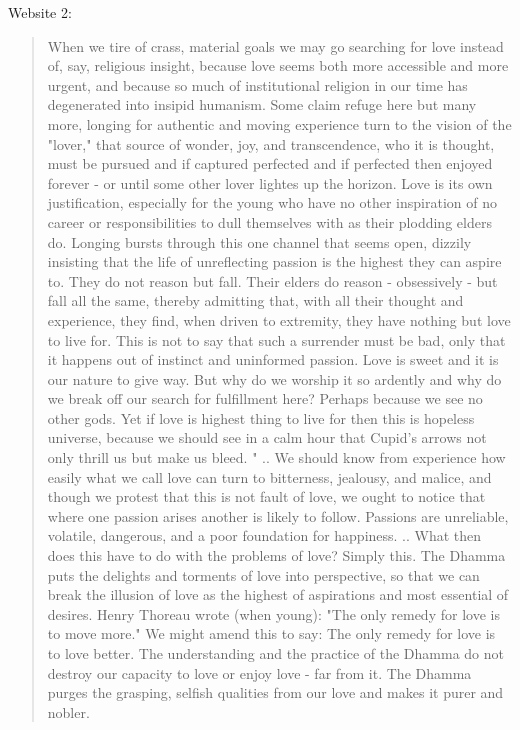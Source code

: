 \documentclass{book}
\begin{document}
Website 2:
\begin{quotation}
When we tire of crass, material goals we may go searching for love instead of, say, religious insight, because love seems both more accessible and more urgent, and because so much of institutional religion in our time has degenerated into insipid humanism. Some claim refuge here but many more, longing for authentic and moving experience turn to the vision of the "lover," that source of wonder, joy, and transcendence, who it is thought, must be pursued and if captured perfected and if perfected then enjoyed forever - or until some other lover lightes up the horizon. Love is its own justification, especially for the young who have no other inspiration of no career or responsibilities to dull themselves with as their plodding elders do. Longing bursts through this one channel that seems open, dizzily insisting that the life of unreflecting passion is the highest they can aspire to. They do not reason but fall. Their elders do reason - obsessively - but fall all the same, thereby admitting that, with all their thought and experience, they find, when driven to extremity, they have nothing but love to live for.
This is not to say that such a surrender must be bad, only that it happens out of instinct and uninformed passion. Love is sweet and it is our nature to give way. But why do we worship it so ardently and why do we break off our search for fulfillment here? Perhaps because we see no other gods. Yet if love is highest thing to live for then this is hopeless universe, because we should see in a calm hour that Cupid's arrows not only thrill us but make us bleed.
"
.. We should know from experience how easily what we call love can turn to bitterness, jealousy, and malice, and though we protest that this is not fault of love, we ought to notice that where one passion arises another is likely to follow. Passions are unreliable, volatile, dangerous, and a poor foundation for happiness.
.. What then does this have to do with the problems of love? Simply this. The Dhamma puts the delights and torments of love into perspective, so that we can break the illusion of love as the highest of aspirations and most essential of desires. Henry Thoreau wrote (when young): "The only remedy for love is to move more." We might amend this to say: The only remedy for love is to love better. The understanding and the practice of the Dhamma do not destroy our capacity to love or enjoy love - far from it. The Dhamma purges the grasping, selfish qualities from our love and makes it purer and nobler.

\end{quotation}
\end{document}
